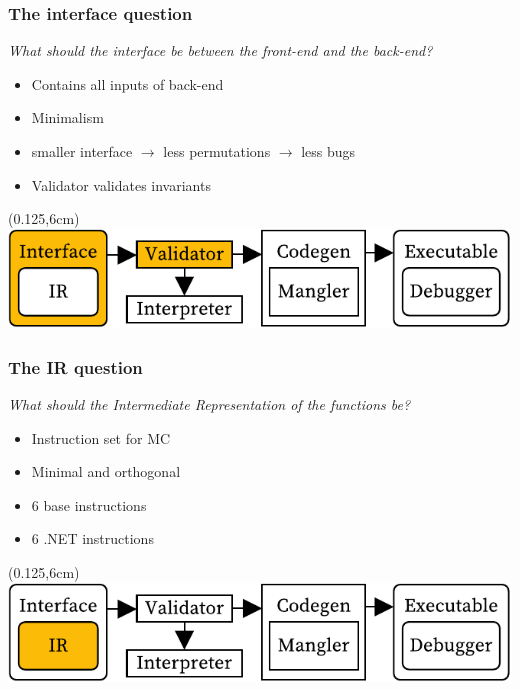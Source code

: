 \documentclass[xetex,serif,aspectratio=169]{beamer}
\begin{document}
\begin{frame}[t]
\end{frame}\begin{frame}[t]\frametitle{The interface question}
\textit{What should the interface be between the front-end and the back-end?}
\begin{itemize}
    \item Contains all inputs of back-end 
    \item Minimalism
    \item smaller interface $\longrightarrow$ less permutations $\longrightarrow$ less bugs
    \item Validator validates invariants
\end{itemize}
\begin{textblock*}{0.75\paperwidth}(0.125\paperwidth,6cm)\includegraphics[width=0.75\paperwidth]{overview_interface}\end{textblock*}

\end{frame}\begin{frame}[t]\frametitle{The IR question}
\textit{What should the Intermediate Representation of the functions be?}
\begin{itemize}
    \item Instruction set for MC
    \item Minimal and orthogonal
    \item 6 base instructions 
    \item 6 .NET instructions
\end{itemize}
\begin{textblock*}{0.75\paperwidth}(0.125\paperwidth,6cm)\includegraphics[width=0.75\paperwidth]{overview_ir}\end{textblock*}


\end{frame}
\end{document}
